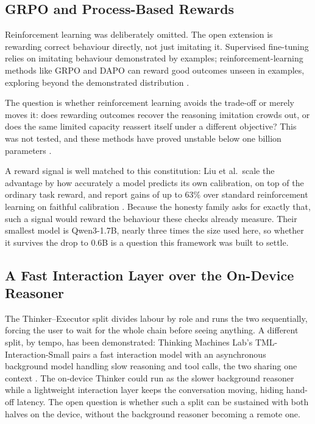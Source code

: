 \subsection{GRPO and Process-Based Rewards}
\label{subsec:conclusion-future-grpo}

Reinforcement learning was deliberately omitted. The open extension is rewarding correct behaviour directly, not just imitating it. Supervised fine-tuning relies on imitating behaviour demonstrated by examples; reinforcement-learning methods like GRPO and DAPO can reward good outcomes unseen in examples, exploring beyond the demonstrated distribution \cite{shao2024deepseekmathpushinglimitsmathematical, yu2025dapoopensourcellmreinforcement}.

The question is whether reinforcement learning avoids the trade-off or merely moves it: does rewarding outcomes recover the reasoning imitation crowds out, or does the same limited capacity reassert itself under a different objective? This was not tested, and these methods have proved unstable below one billion parameters \cite{wang2025ragenunderstandingselfevolutionllm, wei2025reactplannercentricframeworkcomplex}. 

A reward signal is well matched to this constitution: Liu et al.\ scale the advantage by how accurately a model predicts its own calibration, on top of the ordinary task reward, and report gains of up to 63\% over standard reinforcement learning on faithful calibration \cite{liu2026reinforcementlearningmetacognitivefeedback}. Because the honesty family asks for exactly that, such a signal would reward the behaviour these checks already measure. Their smallest model is Qwen3-1.7B, nearly three times the size used here, so whether it survives the drop to 0.6B is a question this framework was built to settle.

\subsection{A Fast Interaction Layer over the On-Device Reasoner}
\label{subsec:conclusion-future-interaction}

The Thinker--Executor split divides labour by role and runs the two sequentially, forcing the user to wait for the whole chain before seeing anything. A different split, by tempo, has been demonstrated: Thinking Machines Lab's TML-Interaction-Small pairs a fast interaction model with an asynchronous background model handling slow reasoning and tool calls, the two sharing one context \cite{thinkingmachines2026interaction}. The on-device Thinker could run as the slower background reasoner while a lightweight interaction layer keeps the conversation moving, hiding hand-off latency. The open question is whether such a split can be sustained with both halves on the device, without the background reasoner becoming a remote one.


